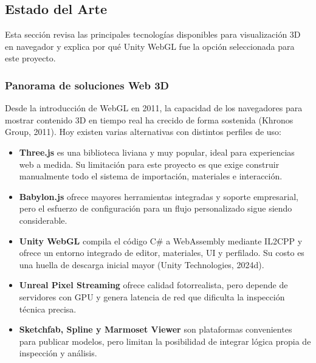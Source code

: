 \subsection{Estado del Arte}

Esta secci\'on revisa las principales tecnolog\'ias disponibles para visualizaci\'on 3D en navegador y explica por qu\'e Unity WebGL fue la opci\'on seleccionada para este proyecto.

\subsubsection{Panorama de soluciones Web 3D}

Desde la introducci\'on de WebGL en 2011, la capacidad de los navegadores para mostrar contenido 3D en tiempo real ha crecido de forma sostenida (Khronos Group, 2011). Hoy existen varias alternativas con distintos perfiles de uso:

\begin{itemize}
    \item \textbf{Three.js} es una biblioteca liviana y muy popular, ideal para experiencias web a medida. Su limitaci\'on para este proyecto es que exige construir manualmente todo el sistema de importaci\'on, materiales e interacci\'on.
    \item \textbf{Babylon.js} ofrece mayores herramientas integradas y soporte empresarial, pero el esfuerzo de configuraci\'on para un flujo personalizado sigue siendo considerable.
    \item \textbf{Unity WebGL} compila el c\'odigo C\# a WebAssembly mediante IL2CPP y ofrece un entorno integrado de editor, materiales, UI y perfilado. Su costo es una huella de descarga inicial mayor (Unity Technologies, 2024d).
    \item \textbf{Unreal Pixel Streaming} ofrece calidad fotorrealista, pero depende de servidores con GPU y genera latencia de red que dificulta la inspecci\'on t\'ecnica precisa.
    \item \textbf{Sketchfab, Spline y Marmoset Viewer} son plataformas convenientes para publicar modelos, pero limitan la posibilidad de integrar l\'ogica propia de inspecci\'on y an\'alisis.
\end{itemize}

